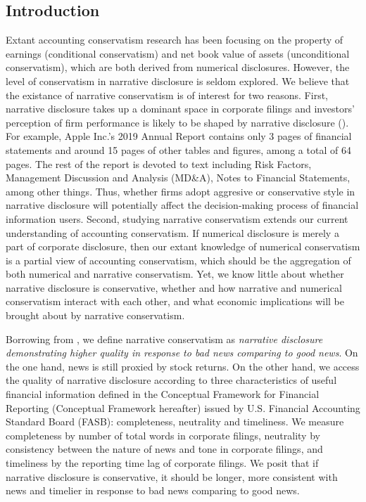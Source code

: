 \documentclass[a4paper]{article}
\begin{document}
\begin{spacing}{2}
\section{Introduction}
Extant accounting conservatism research has been focusing on the property of earnings (conditional conservatism) and net book value of assets (unconditional conservatism), which are both derived from numerical disclosures. However, the level of conservatism in narrative disclosure is seldom explored. We believe that the existance of narrative conservatism is of interest for two reasons. First, narrative disclosure takes up a dominant space in corporate filings and investors' perception of firm performance is likely to be shaped by narrative disclosure (\cite{liTextualAnalysisCorporate2010}). For example, Apple Inc.'s 2019 Annual Report contains only 3 pages of financial statements and around 15 pages of other tables and figures, among a total of 64 pages. The rest of the report is devoted to text including Risk Factors, Management Discussion and Analysis (MD\&A), Notes to Financial Statements, among other things. Thus, whether firms adopt aggresive or conservative style in narrative disclosure will potentially affect the decision-making process of financial information users. Second, studying narrative conservatism extends our current understanding of accounting conservatism. If numerical disclosure is merely a part of corporate disclosure, then our extant knowledge of numerical conservatism is a partial view of accounting conservatism, which should be the aggregation of both numerical and narrative conservatism. Yet, we know little about whether narrative disclosure is conservative, whether and how narrative and numerical conservatism interact with each other, and what economic implications will be brought about by narrative conservatism. 

Borrowing from \cite{basuConservatismPrincipleAsymmetric1997}, we define narrative conservatism as \textit{narrative disclosure demonstrating higher quality in response to bad news comparing to good news}. On the one hand, news is still proxied by stock returns. On the other hand, we access the quality of narrative disclosure according to three characteristics of useful financial information defined in the Conceptual Framework for Financial Reporting (Conceptual Framework hereafter) issued by U.S. Financial Accounting Standard Board (FASB): completeness, neutrality and timeliness. We measure completeness by number of total words in corporate filings, neutrality by consistency between the nature of news and tone in corporate filings, and timeliness by the reporting time lag of corporate filings. We posit that if narrative disclosure is conservative, it should be longer, more consistent with news and timelier in response to bad news comparing to good news.


\end{spacing}
\end{document}
